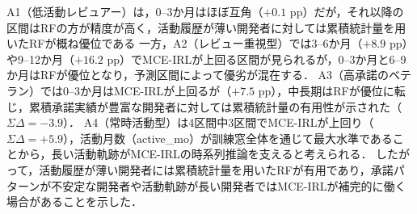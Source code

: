 \documentclass[submit,noauthor,ses,dvipdfmx]{ipsj}
\newcommand{\todo}[1]{\colorbox{yellow}{{\bf TODO}:}{\color{red} {\textbf{[#1]}}}}
\begin{document}
A1（低活動レビュアー）は，0--3か月はほぼ互角（$+0.1$ pp）だが，それ以降の区間はRFの方が精度が高く，活動履歴が薄い開発者に対しては累積統計量を用いたRFが概ね優位である
一方，A2（レビュー重視型）では3--6か月（$+8.9$ pp）や9--12か月（$+16.2$ pp）でMCE-IRLが上回る区間が見られるが，0--3か月と6--9か月はRFが優位となり，予測区間によって優劣が混在する．
A3（高承諾のベテラン）では0--3か月はMCE-IRLが上回るが（$+7.5$ pp），中長期はRFが優位に転じ，累積承諾実績が豊富な開発者に対しては累積統計量の有用性が示された（$\Sigma\Delta = -3.9$）．
A4（常時活動型）は4区間中3区間でMCE-IRLが上回り（$\Sigma\Delta = +5.9$），活動月数（active\_mo）が訓練窓全体を通じて最大水準であることから，長い活動軌跡がMCE-IRLの時系列推論を支えると考えられる．
したがって，活動履歴が薄い開発者には累積統計量を用いたRFが有用であり，承諾パターンが不安定な開発者や活動軌跡が長い開発者ではMCE-IRLが補完的に働く場合があることを示した．




\end{document}
